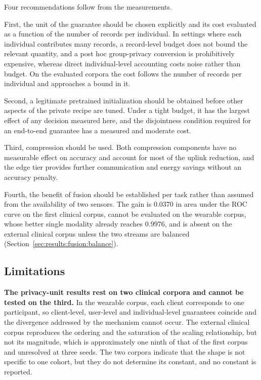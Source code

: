 Four recommendations follow from the measurements.

First, the unit of the guarantee should be chosen explicitly and its cost
evaluated as a function of the number of records per individual. In settings
where each individual contributes many records, a record-level budget does not
bound the relevant quantity, and a post hoc group-privacy conversion is
prohibitively expensive, whereas direct individual-level accounting costs noise
rather than budget. On the evaluated corpora the cost follows the number of
records per individual and approaches a bound in it.

Second, a legitimate pretrained initialization should be obtained before other
aspects of the private recipe are tuned. Under a tight budget, it has the
largest effect of any decision measured here, and the disjointness condition
required for an end-to-end guarantee has a measured and moderate cost.

Third, compression should be used. Both compression components have no
measurable effect on accuracy and account for most of the uplink reduction,
and the edge tier provides further communication and energy savings without an
accuracy penalty.

Fourth, the benefit of fusion should be established per task rather than
assumed from the availability of two sensors. The gain is $0.0370$ in area
under the ROC curve on the first clinical corpus, cannot be evaluated on the
wearable corpus, whose better single modality already reaches $0.9976$, and is
absent on the external clinical corpus unless the two streams are balanced
(Section~\ref{sec:results:fusion:balance}).

\subsection{Limitations}
\label{sec:discussion:limits}

\textbf{The privacy-unit results rest on two clinical corpora and cannot be
tested on the third.} In the wearable corpus, each client corresponds to one
participant, so client-level, user-level and individual-level guarantees
coincide and the divergence addressed by the mechanism cannot occur. The
external clinical corpus reproduces the ordering and the saturation of the
scaling relationship, but not its magnitude, which is approximately one ninth of that of
the first corpus and unresolved at three seeds. The two corpora indicate that
the shape is not specific to one cohort, but they do not determine its
constant, and no constant is reported.

